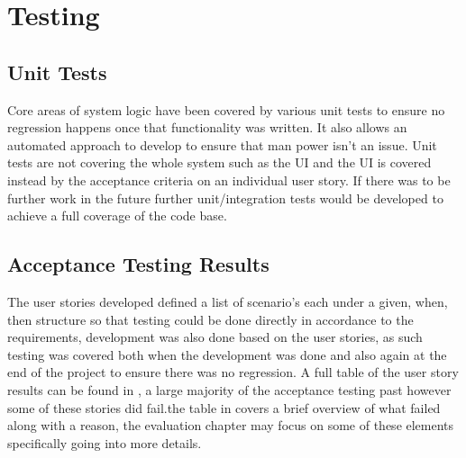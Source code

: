 \section{Testing}
\subsection{Unit Tests}
Core areas of system logic have been covered by various unit tests to ensure no regression happens once that functionality was written. It also allows an automated approach to develop to ensure that man power isn't an issue. Unit tests are not covering the whole system such as the UI and the UI is covered instead by the acceptance criteria on an individual user story. If there was to be further work in the future further unit/integration tests would be developed to achieve a full coverage of the code base.

\subsection{Acceptance Testing Results}
The user stories developed defined a list of scenario's each under a given, when, then structure so that testing could be done directly in accordance to the requirements, development was also done based on the user stories, as such testing was covered both when the development was done and also again at the end of the project to ensure there was no regression. A full table of the user story results can be found in \cite{appendix:acres}, a large majority of the acceptance testing past however some of these stories did fail.the table in \cite{appendix:acres} covers a brief overview of what failed along with a reason, the evaluation chapter may focus on some of these elements specifically going into more details.